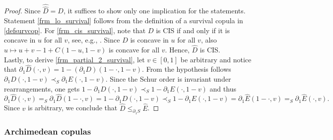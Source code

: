 \documentclass{article}
\begin{document}
\begin{proof}
    Since $\hat{\hat{D}}=D$, it suffices to show only one implication for the statements.
    Statement \eqref{frm_lo_survival} follows from the definition of a survival copula in \eqref{defsurvcop}.
    For \eqref{frm_cis_survival}, note that $D$ is CIS if and only if it is concave in $u$ for all $v$, see, e.g., \cite[Corollary 5.2.11]{Nelsen-2006}.
    Since $D$ is concave in $u$ for all $v$, also $u \mapsto u + v - 1 + C(1-u, 1-v)$ is concave for all $v$.
    Hence, $\hat{D}$ is CIS. \\
    Lastly, to derive \eqref{frm_partial_2_survival}, let $v\in[0,1]$ be arbitrary and notice that $\partial_1\hat{D}(\cdot,v) = 1- (\partial_1 D)(1-\cdot, 1-v)$.
    From the hypothesis follows $\partial_1 D(\cdot, 1-v)\prec_S \partial_1 E(\cdot, 1-v)$.
    Since the Schur order is invariant under rearrangements, one gets $ 1-\partial_1 D(\cdot, 1-v)\prec_S 1- \partial_1 E(\cdot, 1-v)$ and thus
    \[ 
        \partial_1\hat{D}(\cdot, v)
        =_S \partial_1\hat{D}(1-\cdot, v)
        = 1- \partial_1 D(\cdot, 1-v)
        \prec_S
        1-\partial_1 E(\cdot, 1-v)
        =\partial_1\hat{E}(1-\cdot, v)
        =_S\partial_1\hat{E}(\cdot, v)
    .\]
    Since $v$ is arbitrary, we conclude that $\hat{D}\leq_{\partial_1 S} \hat{E}$.
\end{proof}

\subsubsection{Archimedean copulas}\label{secdeppropArch}
\end{document}

